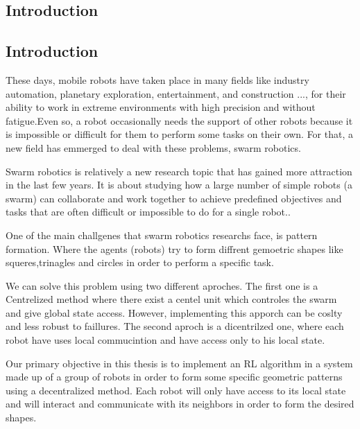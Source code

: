 \documentclass[12pt]{article}
\begin{document}
\newpage
\thispagestyle{empty}
{
\hypersetup{linkcolor=false}
\tableofcontents

}
\newpage
\pagebreak
\hspace{0pt}
\vfill
\begin{center}
\section{Introduction}
\end{center}
\vfill
\hspace{0pt}
\pagebreak

\subsection{Introduction}
These days, mobile robots have taken place in many fields like industry automation, planetary exploration, entertainment, and construction ..., for their ability to work in extreme environments with high precision and without fatigue\cite{rubio2019review}.Even so, a robot occasionally needs the support of other robots because it is impossible or difficult for them to perform some tasks on their own. For that, a new field has emmerged to deal with these problems, swarm robotics.

 
Swarm robotics is relatively a new research topic that has gained more attraction in the last few years. It is about  studying how a large number of simple robots (a swarm) can collaborate and work together to achieve predefined objectives and tasks that are often difficult or impossible to do for a single robot.\cite{bayindir2016review}.

One of the main challgenes that swarm robotics researchs face, is pattern formation. Where the agents (robots) try to form diffrent gemoetric shapes like squeres,trinagles and circles in order to perform a specific task.

We can solve this problem using two different aproches. The first one is a Centrelized method where there exist a centel unit  which controles the swarm and give global state access. However,  implementing this apporch  can be coslty and less robust to faillures. The second aproch is a dicentrilzed one, where each robot have uses local commucintion and have access only to his local state.\cite{bayindir2007review}

Our primary objective in this thesis is to implement an RL algorithm in a system made up of a group of robots in order to form some specific geometric patterns using a decentralized  method. Each robot will only have access to its local state and will interact and communicate with its neighbors in order to form the desired shapes.
 
\end{document}
